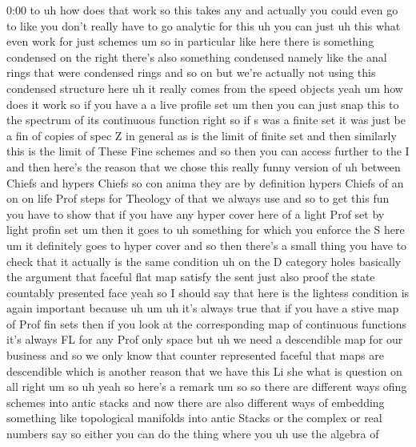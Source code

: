 \begin{unfinished}{0:00}
to  uh  how  does  that  work  so  this  takes
any  and  actually  you  could  even  go  to
like  you  don't  really  have  to  go
analytic  for  this
uh  you  can
just
uh  this  what  even  work  for  just  schemes
um  so  in  particular  like  here  there  is
something  condensed  on  the  right  there's
also  something  condensed  namely  like  the
anal  rings  that  were  condensed  rings  and
so  on  but  we're  actually  not  using  this
condensed  structure  here  uh  it  really
comes  from  the  speed  objects  yeah  um  how
does  it  work  so  if  you  have  a  a  live
profile
set  um
then  you  can  just  snap  this  to  the
spectrum  of  its  continuous
function
right  so  if  s  was  a  finite  set  it  was
just  be  a  fin  of  copies  of  spec  Z  in
general  as  is  the  limit  of  finite  set
and  then  similarly  this  is  the  limit  of
These  Fine
schemes  and  so  then  you  can  access
further  to  the
I  and  then  here's  the  reason  that  we
chose  this  really  funny  version  of
uh  between  Chiefs  and  hypers  Chiefs  so
con  anima  they  are  by  definition  hypers
Chiefs
of
an  on  on  life  Prof  steps  for  Theology  of
that  we  always
use  and  so  to  get  this  fun  you  have  to
show  that  if  you  have  any  hyper  cover
here  of  a  light  Prof  set  by  light  profin
set  um  then  it  goes  to  uh  something  for
which  you  enforce  the  S  here  um  it
definitely  goes  to  hyper  cover  and  so
then  there's  a  small  thing  you  have  to
check  that  it  actually  is  the  same
condition  uh  on  the  D  category
holes  basically  the  argument  that
faceful  flat  map  satisfy  the  sent  just
also  proof  the
state  countably  presented  face  yeah  so  I
should  say  that  here  is  the  lightess
condition  is  again  important  because  uh
um  uh  it's  always  true  that  if  you  have
a  stive  map  of  Prof  fin
sets  then  if  you  look  at  the
corresponding  map  of  continuous
functions  it's  always  FL  for  any  Prof
only
space  but  uh  we  need  a  descendible  map
for  our  business  and  so  we  only  know
that  counter  represented  faceful  that
maps  are  descendible  which  is  another
reason  that  we  have  this
Li
she
what  is
question
on
all  right
um  so
uh  yeah  so  here's  a  remark  um
so  so  there  are  different  ways  ofing
schemes  into  antic  stacks  and  now  there
are  also  different  ways  of  embedding
something  like  topological  manifolds
into  antic  Stacks  or  the  complex  or  real
numbers  say  so  either  you  can  do  the
thing  where  you  uh  use  the  algebra  of

\end{unfinished}
